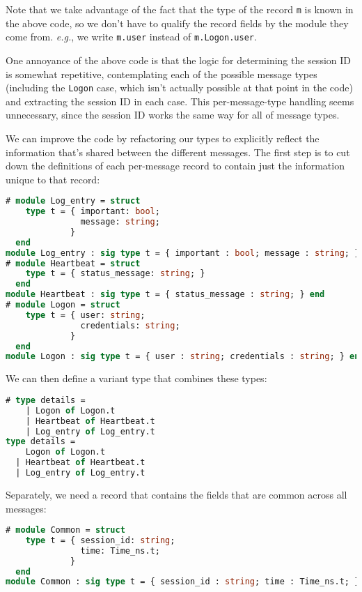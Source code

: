 Note that we take advantage of the fact that the type of the record
\passthrough{\lstinline!m!} is known in the above code, so we don't have
to qualify the record fields by the module they come from. \emph{e.g.},
we write \passthrough{\lstinline!m.user!} instead of
\passthrough{\lstinline!m.Logon.user!}.

One annoyance of the above code is that the logic for determining the
session ID is somewhat repetitive, contemplating each of the possible
message types (including the \passthrough{\lstinline!Logon!} case, which
isn't actually possible at that point in the code) and extracting the
session ID in each case. This per-message-type handling seems
unnecessary, since the session ID works the same way for all of message
types.

We can improve the code by refactoring our types to explicitly reflect
the information that's shared between the different messages. The first
step is to cut down the definitions of each per-message record to
contain just the information unique to that record:

\begin{lstlisting}[language=Caml]
# module Log_entry = struct
    type t = { important: bool;
               message: string;
             }
  end
module Log_entry : sig type t = { important : bool; message : string; } end
# module Heartbeat = struct
    type t = { status_message: string; }
  end
module Heartbeat : sig type t = { status_message : string; } end
# module Logon = struct
    type t = { user: string;
               credentials: string;
             }
  end
module Logon : sig type t = { user : string; credentials : string; } end
\end{lstlisting}

We can then define a variant type that combines these types:

\begin{lstlisting}[language=Caml]
# type details =
    | Logon of Logon.t
    | Heartbeat of Heartbeat.t
    | Log_entry of Log_entry.t
type details =
    Logon of Logon.t
  | Heartbeat of Heartbeat.t
  | Log_entry of Log_entry.t
\end{lstlisting}

Separately, we need a record that contains the fields that are common
across all messages:

\begin{lstlisting}[language=Caml]
# module Common = struct
    type t = { session_id: string;
               time: Time_ns.t;
             }
  end
module Common : sig type t = { session_id : string; time : Time_ns.t; } end
\end{lstlisting}

